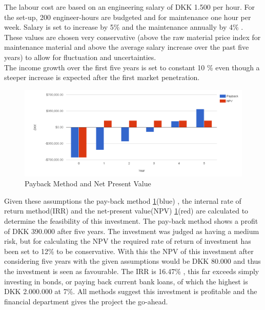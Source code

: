 The labour cost are based on an engineering salary of DKK 1.500 per hour. For the set-up, 200 engineer-hours are budgeted and for maintenance one hour per week. Salary is set to increase by 5\% and the maintenance annually by 4\% . These values are chosen very conservative (above the raw material price index for maintenance material and above the average salary increase over the past five years) to allow for fluctuation and uncertainties. \\ The income growth over the first five years is set to constant 10 \% even though a steeper increase is expected after the first market penetration.\\
    \begin{figure}[h]
        \centering
        \includegraphics[width=1.0\textwidth]{figs/pb_npv}
        \caption{Payback Method and Net Present Value}
        \label{fig:payback_npv}
    \end{figure}

Given these assumptions the pay-back method \ref{fig:payback_npv}(blue) , the internal rate of return method(IRR) and the net-present value(NPV) \ref{fig:payback_npv}(red) are calculated to determine the feasibility of this investment.
The pay-back method shows a profit of DKK 390.000 after five years. The investment was judged as having a medium risk, but for calculating the NPV the required rate of return of investment has been set to 12\% to be conservative. With this the NPV of this investment after considering five years with the given assumptions would be DKK 80.000 and thus the investment is seen as favourable. The IRR is 16.47\% , this far exceeds simply investing in bonds, or paying back current bank loans, of which the highest is DKK 2.000.000 at 7\%.
All methods suggest this investment is profitable and the financial department gives the project the go-ahead.

